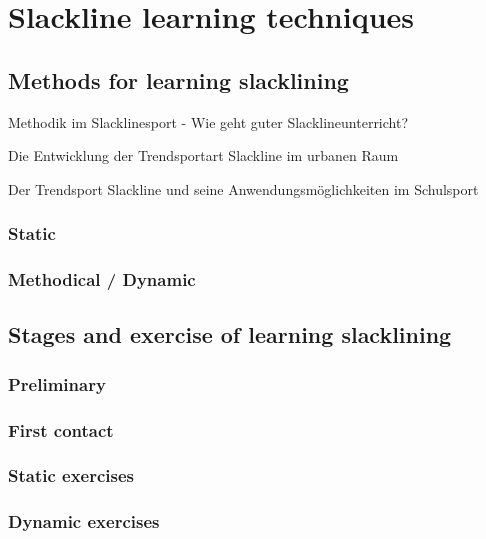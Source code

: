 \section{Slackline learning techniques}\label{3_3_learningTechniques}

\subsection{Methods for learning slacklining}
\cite{Thomann2013-aa}
Methodik im Slacklinesport - Wie geht guter Slacklineunterricht?

\cite{Thomann2017-ab}
Die Entwicklung der Trendsportart Slackline im urbanen Raum


\cite{Kroiss2007-ab}
Der Trendsport Slackline und seine Anwendungsmöglichkeiten im Schulsport
\subsubsection{Static}
\subsubsection{Methodical / Dynamic}



\subsection{Stages and exercise of learning slacklining}\label{3_2_2_StagesExercises}
\subsubsection{Preliminary}
\subsubsection{First contact}
\subsubsection{Static exercises}
\subsubsection{Dynamic exercises}
